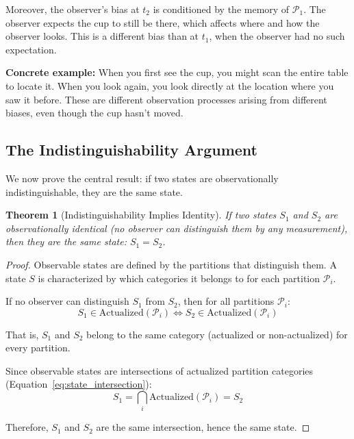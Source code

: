 \documentclass[twocolumn,10pt]{article}
\newtheorem{theorem}{Theorem}[section]
\theoremstyle{definition}
\theoremstyle{remark}
\begin{document}
\noindent Moreover, the observer's bias at $t_2$ is conditioned by the memory of $\mathcal{P}_1$. The observer expects the cup to still be there, which affects where and how the observer looks. This is a different bias than at $t_1$, when the observer had no such expectation.

\vspace{0.2cm}
\noindent\textbf{Concrete example:} When you first see the cup, you might scan the entire table to locate it. When you look again, you look directly at the location where you saw it before. These are different observation processes arising from different biases, even though the cup hasn't moved.

\subsection{The Indistinguishability Argument}

We now prove the central result: if two states are observationally indistinguishable, they are the same state.

\begin{theorem}[Indistinguishability Implies Identity]
\label{thm:indistinguishability}
If two states $S_1$ and $S_2$ are observationally identical (no observer can distinguish them by any measurement), then they are the same state: $S_1 = S_2$.
\end{theorem}

\begin{proof}
Observable states are defined by the partitions that distinguish them. A state $S$ is characterized by which categories it belongs to for each partition $\mathcal{P}_i$. 

If no observer can distinguish $S_1$ from $S_2$, then for all partitions $\mathcal{P}_i$:
\begin{equation}
S_1 \in \text{Actualized}(\mathcal{P}_i) \iff S_2 \in \text{Actualized}(\mathcal{P}_i)
\end{equation}

That is, $S_1$ and $S_2$ belong to the same category (actualized or non-actualized) for every partition.

Since observable states are intersections of actualized partition categories (Equation~\ref{eq:state_intersection}):
\begin{equation}
S_1 = \bigcap_i \text{Actualized}(\mathcal{P}_i) = S_2
\end{equation}

Therefore, $S_1$ and $S_2$ are the same intersection, hence the same state.
\end{proof}
\end{document}
